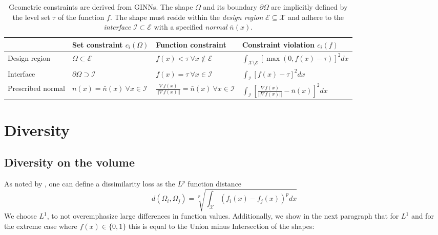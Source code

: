 \def\normal{ \frac{\nabla f(x)}{||\nabla f(x)||}}
\renewcommand{\arraystretch}{1.5} %
\begin{table*}
    \small
    \caption{
        Geometric constraints are derived from GINNs.
        The shape $\Omega$ and its boundary $\partial\Omega$ are implicitly defined by the level set $\tau$ of the function $f$.
        The shape must reside within the \emph{design region} $\mathcal{E}\subseteq\mathcal{X}$ and adhere to the \emph{interface} $\mathcal{I}\subset\mathcal{E}$ with a specified \emph{normal} $\bar{n}(x)$.
        }
    \centering
    \begin{tabular}{l|l|l|l}
        & Set constraint $c_i(\Omega)$ & Function constraint & Constraint violation $c_i(f)$ \\
        \hline
        Design region 
            & $\Omega \subset \mathcal{E}$ 
            & $f(x) < \tau \ \forall x \notin \mathcal{E} $
            & $\int_{\mathcal{X}\setminus\mathcal{E}} \left[ \operatorname{max}(0, f(x) - \tau) \right]^2 dx$ \\
        Interface 
            & $\partial\Omega \supset \mathcal{I}$
            & $f(x) = \tau \ \forall x \in \mathcal{I}$
            & $\int_\mathcal{I} \left[ f(x) - \tau \right]^2 dx$ \\
        Prescribed normal
            & $n(x)=\bar{n}(x) \ \forall x \in \mathcal{I}$ 
            & $\normal = \bar{n}(x) \ \forall x \in \mathcal{I}$
            & $\int_\mathcal{I} \left[ \normal - \bar{n}(x)\right]^2 dx$ \\
    \end{tabular}
    
    \label{tab:constraints}
\end{table*}

\section{Diversity}

\subsection{Diversity on the volume}
\label{subsec:volume_dissimilarity}

As noted by \citet{GINNs}, one can define a dissimilarity loss as the $L^p$ function distance
\begin{equation}
d(\Omega_i, \Omega_j) = \sqrt[p]{\int_\mathcal{X} (f_i(x) - f_j(x))^p dx}
\end{equation}
We choose $L^1$, to not overemphasize large differences in function values.
Additionally, we show in the next paragraph that for $L^1$ and for the extreme case where $f(x) \in \{0, 1\}$ this is equal to the Union minus Intersection of the shapes: 

